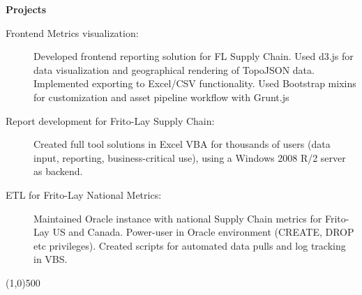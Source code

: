 \documentclass[letterpaper,11pt]{article}
\newcommand{\resheading}[1]{{\large {\textbf{#1 \vphantom{p\^{E}}}}}}
\newcommand{\addline}{\line(1,0){500}}
\begin{document}
\resheading{Projects}

\begin{description}
	\item [Frontend Metrics visualization:] Developed frontend reporting solution 
	for FL Supply Chain. Used d3.js for data visualization and geographical 
	rendering of TopoJSON data. Implemented exporting to Excel/CSV functionality. 
	Used Bootstrap mixins for customization and asset pipeline workflow
	 with Grunt.js

	\item [Report development for Frito-Lay Supply Chain:] Created full tool 
	solutions in Excel VBA for thousands of users (data input, reporting, 
	business-critical use), using a Windows 2008 R/2 server as backend.

	\item [ETL for Frito-Lay National Metrics:] Maintained Oracle instance with 
	national Supply Chain metrics for Frito-Lay US and Canada. Power-user in 
	Oracle environment (CREATE, DROP etc privileges). Created scripts for 
	automated data pulls and log tracking in VBS. 

\end{description}

\addline
\end{document}
